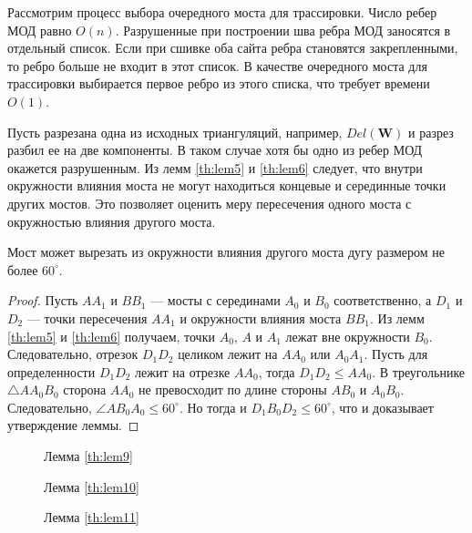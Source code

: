 \documentclass[12pt]{article}
\begin{document}
Рассмотрим процесс выбора очередного моста для трассировки.
Число ребер МОД равно $O(n)$.
Разрушенные при построении шва ребра МОД заносятся в отдельный список.
Если при сшивке оба сайта ребра становятся закрепленными, то ребро больше не входит в этот список.
В качестве очередного моста для трассировки выбирается первое ребро из этого списка, что требует времени $O(1)$.

Пусть разрезана одна из исходных триангуляций, например, $Del(\textbf{W})$ и разрез разбил ее на две компоненты.
В таком случае хотя бы одно из ребер МОД окажется разрушенным.
Из лемм \ref{th:lem5} и \ref{th:lem6} следует,
что внутри окружности влияния моста не могут находиться концевые и серединные точки других мостов.
Это позволяет оценить меру пересечения одного моста с окружностью влияния другого моста.

\begin{lemma}
\label{th:lem9}
Мост может вырезать из окружности влияния другого моста дугу размером не более $60^\circ$.
\end{lemma}

\begin{proof}
Пусть $AA_1$ и $BB_1$ --- мосты с серединами $A_0$ и $B_0$ соответственно,
а $D_1$ и $D_2$ --- точки пересечения $AA_1$ и окружности влияния моста $BB_1$.
Из лемм \ref{th:lem5} и \ref{th:lem6} получаем, точки $A_0$, $A$ и $A_1$ лежат вне окружности $B_0$.
Следовательно, отрезок $D_1D_2$ целиком лежит на $AA_0$ или $A_0A_1$.
Пусть для определенности $D_1D_2$ лежит на отрезке $AA_0$, тогда $D_1D_2 \le AA_0$.
В треугольнике $\triangle AA_0B_0$ сторона $AA_0$ не превосходит по длине стороны $AB_0$ и $A_0B_0$.
Следовательно, $\angle AB_0A_0 \le 60^\circ$.
Но тогда и $D_1B_0D_2 \le 60^\circ$, что и доказывает утверждение леммы. 
\end{proof}

\begin{figure}[htb!]
	\begin{minipage}[h]{0.32\linewidth}
		\caption{Лемма \ref{th:lem9}}
		\label{pic:lem9}
	\end{minipage}
	\hfill
	\begin{minipage}[h]{0.32\linewidth}
		\caption{Лемма \ref{th:lem10}}
		\label{pic:lem10}
	\end{minipage}
	\begin{minipage}[h]{0.32\linewidth}
		\caption{Лемма \ref{th:lem11}}
		\label{pic:lem11}
	\end{minipage}
\end{figure}
\end{document}
